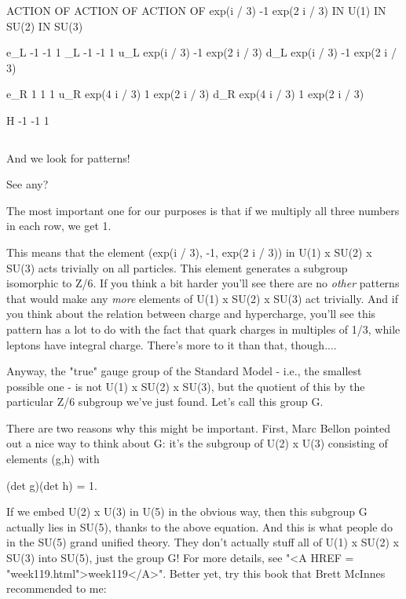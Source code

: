          ACTION OF            ACTION OF             ACTION OF
       exp(\pi  i / 3)            -1               exp(2 \pi  i / 3)
          IN U(1)             IN SU(2)               IN SU(3)

e_L         -1                  -1                     1
\nu _L        -1                  -1                     1
u_L     exp(\pi  i / 3)           -1               exp(2 \pi  i / 3)
d_L     exp(\pi  i / 3)           -1               exp(2 \pi  i / 3)

e_R          1                   1                     1
u_R     exp(4 \pi  i / 3)          1               exp(2 \pi  i / 3)
d_R     exp(4 \pi  i / 3)          1               exp(2 \pi  i / 3)


 H          -1                  -1                     1

$$
    
And we look for patterns!  

See any?

The most important one for our purposes is that if we multiply all three
numbers in each row, we get 1. 

This means that the element (exp(\pi  i / 3), -1, exp(2 \pi  i / 3)) in U(1)
x SU(2) x SU(3) acts trivially on all particles.  This element generates
a subgroup isomorphic to Z/6.  If you think a bit harder you'll see
there are no \emph{other} patterns that would make any \emph{more} elements of
U(1) x SU(2) x SU(3) act trivially.  And if you think about the relation
between charge and hypercharge, you'll see this pattern has a lot to do
with the fact that quark charges in multiples of 1/3, while leptons have
integral charge.  There's more to it than that, though....

Anyway, the "true" gauge group of the Standard Model - i.e., the
smallest possible one - is not U(1) x SU(2) x SU(3), but the quotient of
this by the particular Z/6 subgroup we've just found.  Let's call 
this group G.  

There are two reasons why this might be important.  First, Marc Bellon
pointed out a nice way to think about G: it's the subgroup of U(2) x U(3) 
consisting of elements (g,h) with

(det g)(det h) = 1.

If we embed U(2) x U(3) in U(5) in the obvious way, then this subgroup G
actually lies in SU(5), thanks to the above equation.  And this is what
people do in the SU(5) grand unified theory.  They don't actually stuff
all of U(1) x SU(2) x SU(3) into SU(5), just the group G!  For more
details, see "<A HREF = "week119.html">week119</A>".  Better
yet, try this book that Brett McInnes recommended to me:

